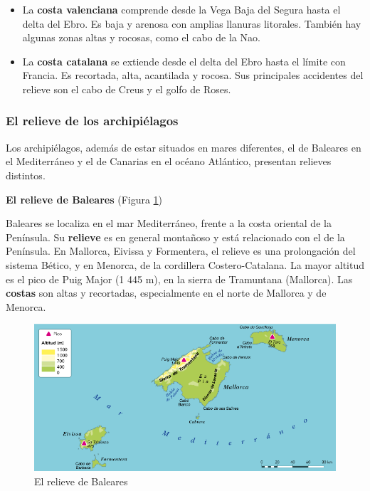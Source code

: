 \begin{itemize}
    \item La \textbf{costa valenciana} comprende desde la Vega Baja del Segura hasta el delta del Ebro. Es baja y arenosa con amplias llanuras litorales. También hay algunas zonas altas y rocosas, como el cabo de la Nao.
    \item La \textbf{costa catalana} se extiende desde el delta del Ebro hasta el límite con Francia. Es recortada, alta, acantilada y rocosa. Sus principales accidentes del relieve son el cabo de Creus y el golfo de Roses.
\end{itemize}

\subsubsection{El relieve de los archipiélagos}

Los archipiélagos, además de estar situados en mares diferentes, el de Baleares en el Mediterráneo y el de Canarias en el océano Atlántico, presentan relieves distintos.

\vspace{3mm}
\textbf{El relieve de Baleares} (Figura \ref{fig:relieve-baleares})

\vspace{3mm}
Baleares se localiza en el mar Mediterráneo, frente a la costa oriental de la Península. Su \textbf{relieve} es en general montañoso y está relacionado con el de la Península. En Mallorca, Eivissa y Formentera, el relieve es una prolongación del sistema Bético, y en Menorca, de la cordillera Costero-Catalana. La mayor altitud es el pico de Puig Major (1 445 m), en la sierra de Tramuntana (Mallorca). Las \textbf{costas} son altas y recortadas, especialmente en el norte de Mallorca y de Menorca.

\begin{figure}[!ht]
    \centering
    \includegraphics[width=0.7\linewidth]{Tema2/03_relieve_Baleares.png}
    \caption{El relieve de Baleares}
    \label{fig:relieve-baleares}
\end{figure}

